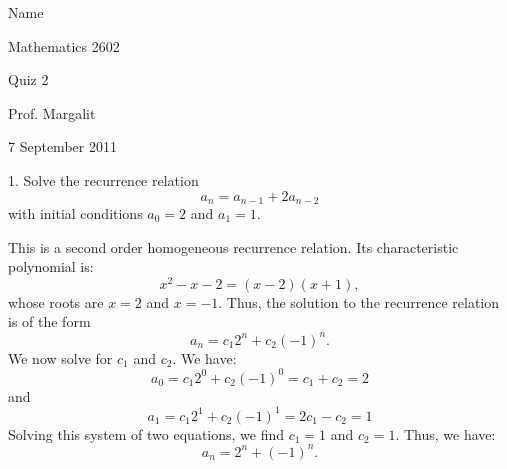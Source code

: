\documentclass[12pt]{article}
\begin{document}




\hspace{3.8in}
Name \underline{\space \space \space \space\space \space \space \space \space
\space
\space \space \space \space \space \space\space \space \space \space \space \space
\space \space  \space \space \space \space \space \space\space \space \space \space \space
\space}
\bigskip

\begin{center}
{\Large Mathematics 2602}

Quiz 2

Prof. Margalit

7 September 2011

\end{center}

1.  Solve the recurrence relation
\[ a_n = a_{n-1} + 2 a_{n-2} \]
with initial conditions $a_0=2$ and $a_1=1$.

\bigskip

This is a second order homogeneous recurrence relation.  Its characteristic polynomial is:
\[ x^2 - x - 2 = (x-2)(x+1), \]
whose roots are $x=2$ and $x=-1$.  Thus, the solution to the recurrence relation is of the form
\[ a_n = c_1 2^n + c_2 (-1)^n. \]
We now solve for $c_1$ and $c_2$.  We have:
\[ a_0 = c_1 2^0 + c_2(-1)^0 = c_1 + c_2 = 2 \]
and
\[ a_1 = c_1 2^1 + c_2(-1)^1 = 2c_1-c_2 = 1 \]
Solving this system of two equations, we find $c_1=1$ and $c_2=1$.  Thus, we have:
\[ a_n = 2^n + (-1)^n. \]


\vfill
\end{document}

